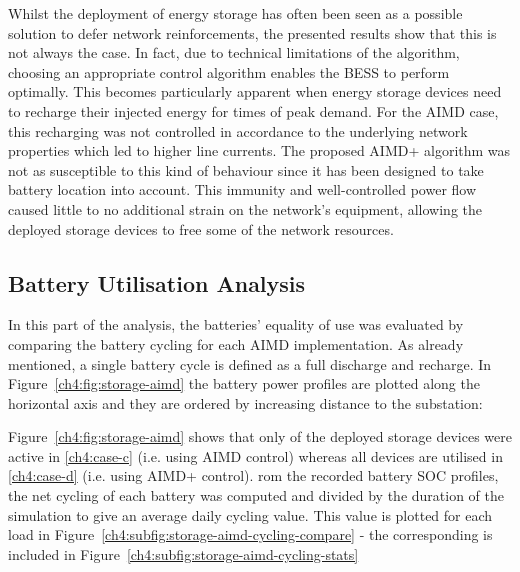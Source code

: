 Whilst the deployment of energy storage has often been seen as a possible solution to defer network reinforcements, the presented results show that this is not always the case.
In fact, due to technical limitations of the algorithm, choosing an appropriate control algorithm enables the BESS to perform optimally.
This becomes particularly apparent when  energy storage devices need to recharge their injected energy for times of peak demand.
For the AIMD case, this recharging was not controlled in accordance to the underlying network properties which led to higher line currents.
The proposed AIMD+ algorithm was not as susceptible to this kind of behaviour since it has been designed to take battery location into account.
This immunity and well-controlled power flow caused little to no additional strain on the network's equipment, allowing the deployed storage devices to free some of the network resources.

\subsection{Battery Utilisation Analysis}

In this part of the analysis, the batteries' equality of use was evaluated by comparing the battery cycling for each AIMD implementation.
As already mentioned, a single battery cycle is defined as a full discharge and recharge.
In Figure~\ref{ch4:fig:storage-aimd} the battery power profiles are plotted along the horizontal axis and they are ordered by increasing distance to the substation:



Figure~\ref{ch4:fig:storage-aimd} shows that only  of the deployed storage devices were active in \ref{ch4:case-c} (i.e. using AIMD control) whereas all devices are utilised in \ref{ch4:case-d} (i.e. using AIMD+ control).
rom the recorded battery SOC profiles, the net cycling of each battery was computed and divided by the duration of the simulation to give an average daily cycling value.
This  value is plotted for each load in Figure~\ref{ch4:subfig:storage-aimd-cycling-compare} - the corresponding  is included in Figure~\ref{ch4:subfig:storage-aimd-cycling-stats}\hlrem{:}

